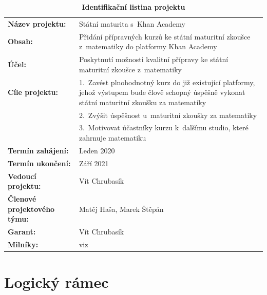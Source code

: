 \documentclass[12pt, a4paper]{report}
\begin{document}
\begin{table}[htbp]
\caption{\textbf{Identifikační listina projektu}}
\centering
\footnotesize
\begin{tabularx}{\textwidth}{lX}
\textbf{Název projektu:} & Státní maturita s Khan Academy\\
\textbf{Obsah:} & Přidání přípravných kurzů ke státní maturitní zkoušce z matematiky do platformy Khan Academy\\
\textbf{Účel:} & Poskytnutí možnosti kvalitní přípravy ke státní maturitní zkoušce z matematiky\\
\textbf{Cíle projektu:} & 1. Zavést plnohodnotný kurz do již existující platformy, jehož výstupem bude člově schopný úspěšně vykonat státní maturitní zkoušku za matematiky\\
 & 2. Zvýšit úspěšnost u maturitní zkoušky za matematiky\\
 & 3. Motivovat účastníky kurzu k dalšímu studio, které zahrnuje matematiku\\
\textbf{Termín zahájení:} & Leden 2020\\
\textbf{Termín ukončení:} & Září 2021\\
\textbf{Vedoucí projektu:} & Vít Chrubasík\\
\textbf{Členové projektového týmu:} & Matěj Haša, Marek Štěpán\\
\textbf{Garant:} & Vít Chrubasík\\
\textbf{Milníky:} & viz \cite{ms_project_soubor}\\
\end{tabularx}
\end{table}


\chapter{Logický rámec}
\label{sec:org84a9c4d}
\end{document}
